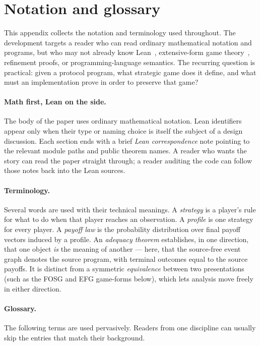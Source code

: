 \section{Notation and glossary}
\label{sec:glossary}

This appendix collects the notation and terminology used throughout.
The development targets a reader who can read ordinary mathematical
notation and programs, but who may not already know
Lean~\citep{deMouraUllrich2021}, extensive-form game
theory~\citep{vonNeumannMorgenstern1944,OsborneRubinstein1994,
ShohamLeytonBrown2009}, refinement proofs, or programming-language
semantics.  The recurring question is practical: given a protocol
program, what strategic game does it define, and what must an
implementation prove in order to preserve that game?

\paragraph{Math first, Lean on the side.}
The body of the paper uses ordinary mathematical notation.  Lean
identifiers appear only when their type or naming choice is itself the
subject of a design discussion.  Each section ends with a brief
\emph{Lean correspondence} note pointing to the relevant module paths and
public theorem names.  A reader who wants the story can read the paper
straight through; a reader auditing the code can follow those notes back
into the Lean sources.

\paragraph{Terminology.}
Several words are used with their technical meanings.  A
\emph{strategy} is a player's rule for what to do when that player
reaches an observation.  A \emph{profile} is one strategy for every
player.  A \emph{payoff law} is the probability distribution over final
payoff vectors induced by a profile.  An \emph{adequacy theorem}
establishes, in one direction, that one object \emph{is} the meaning of
another --- here, that the source-free event graph denotes the source
program, with terminal outcomes equal to the source payoffs.  It is
distinct from a symmetric \emph{equivalence} between two presentations
(such as the FOSG and EFG game-forms below), which lets analysis move
freely in either direction.

\paragraph{Glossary.}
The following terms are used pervasively.  Readers from one
discipline can usually skip the entries that match their background.

